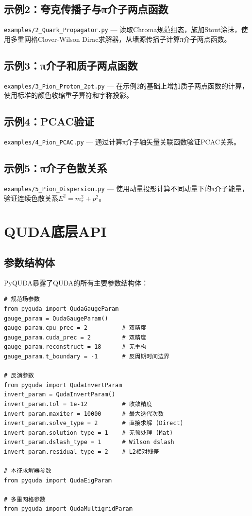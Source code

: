 \documentclass[12pt,a4paper]{ctexart}
\begin{document}
\subsection{示例2：夸克传播子与π介子两点函数}

\texttt{examples/2\_Quark\_Propagator.py} — 读取Chroma规范组态，施加Stout涂抹，使用多重网格Clover-Wilson Dirac求解器，从墙源传播子计算π介子两点函数。

\subsection{示例3：π介子和质子两点函数}

\texttt{examples/3\_Pion\_Proton\_2pt.py} — 在示例2的基础上增加质子两点函数的计算，使用标准的颜色收缩重子算符和宇称投影。

\subsection{示例4：PCAC验证}

\texttt{examples/4\_Pion\_PCAC.py} — 通过计算π介子轴矢量关联函数验证PCAC关系。

\subsection{示例5：π介子色散关系}

\texttt{examples/5\_Pion\_Dispersion.py} — 使用动量投影计算不同动量下的π介子能量，验证连续色散关系$E^2 = m_\pi^2 + p^2$。

\section{QUDA底层API}

\subsection{参数结构体}

PyQUDA暴露了QUDA的所有主要参数结构体：

\begin{lstlisting}[caption={QUDA参数结构体}]
# 规范场参数
from pyquda import QudaGaugeParam
gauge_param = QudaGaugeParam()
gauge_param.cpu_prec = 2          # 双精度
gauge_param.cuda_prec = 2         # 双精度
gauge_param.reconstruct = 18      # 无重构
gauge_param.t_boundary = -1       # 反周期时间边界

# 反演参数
from pyquda import QudaInvertParam
invert_param = QudaInvertParam()
invert_param.tol = 1e-12          # 收敛精度
invert_param.maxiter = 10000      # 最大迭代次数
invert_param.solve_type = 2       # 直接求解 (Direct)
invert_param.solution_type = 1    # 无预处理 (Mat)
invert_param.dslash_type = 1      # Wilson dslash
invert_param.residual_type = 2    # L2相对残差

# 本征求解器参数
from pyquda import QudaEigParam

# 多重网格参数
from pyquda import QudaMultigridParam
\end{lstlisting}
\end{document}
